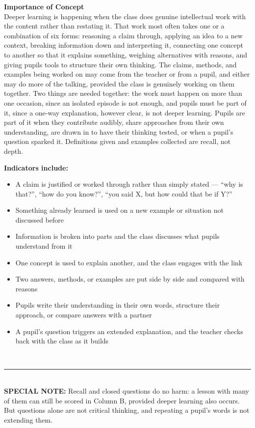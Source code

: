 \documentclass[10pt,a4paper]{article}
\newcommand{\twopane}[2]{%
  \noindent
  \begin{minipage}[t]{0.475\linewidth}\RaggedRight
    {\bfseries\small Importance of Concept}\\[1.4mm]
    \footnotesize #1 \normalsize
  \end{minipage}\hfill
  \begin{minipage}[t]{0.475\linewidth}\RaggedRight
    {\bfseries\small Indicators include:}\\[0.6mm]
    #2
  \end{minipage}\\[2mm]}
\newcommand{\specialnote}[1]{%
  \noindent\textcolor{trule}{\rule{\linewidth}{0.4pt}}\\[1.2mm]
  {\footnotesize\textbf{SPECIAL NOTE:} #1}\\[2mm]}
\begin{document}
\twopane{%
Deeper learning is happening when the class does genuine intellectual work with the content rather than
restating it. That work most often takes one or a combination of six forms: reasoning a claim through, 
applying an idea to a new context, breaking information down and interpreting it, connecting one concept 
to another so that it explains something, weighing alternatives with reasons, and giving pupils tools to 
structure their own thinking. The claims, methods, and examples being worked on may come from the
teacher or from a pupil, and either may do more of the talking, provided the class is genuinely working
on them together. Two things are needed together: the work must happen on more than one occasion, since an 
isolated episode is not enough, and pupils must be part of it, since a one-way explanation, however clear, 
is not deeper learning. Pupils are part of it when they contribute audibly, share approaches from 
their own understanding, are drawn in to have their thinking tested, or when a pupil's question sparked it. 
Definitions given and examples collected are recall, not depth.%
}{%
\footnotesize
\begin{itemize}
  \item A claim is justified or worked through rather than simply stated --- ``why is that?'', ``how do you
        know?'', ``you said X, but how could that be if Y?''
  \item Something already learned is used on a new example or situation not discussed before
  \item Information is broken into parts and the class discusses what pupils understand from it
  \item One concept is used to explain another, and the class engages with the link
  \item Two answers, methods, or examples are put side by side and compared with reasons
  \item Pupils write their understanding in their own words, structure their approach, or compare
        answers with a partner
  \item A pupil's question triggers an extended explanation, and the teacher checks back with the class
        as it builds
\end{itemize}
\normalsize
}
 
\specialnote{Recall and closed questions do no harm: a lesson with many of them can still be scored in
Column B, provided deeper learning also occurs. But questions alone are not critical thinking, and repeating
a pupil's words is not extending them.}
 
\end{document}

